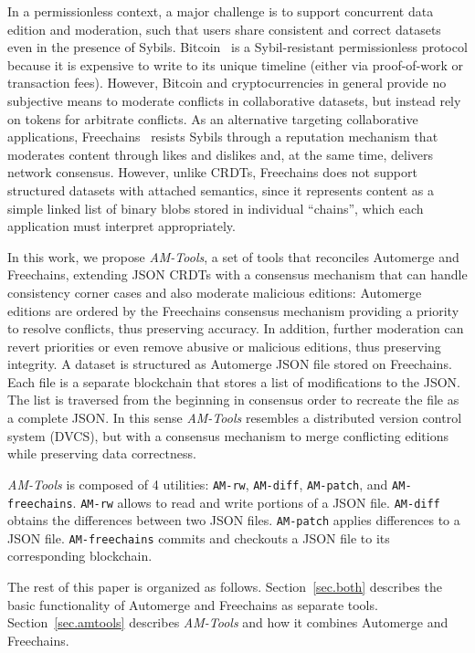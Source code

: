 \documentclass[12pt]{article}
\newcommand{\code}[1]  {\texttt{\footnotesize{#1}}}
\begin{document}
In a permissionless context, a major challenge is to support concurrent data
edition and moderation, such that users share consistent and correct datasets
even in the presence of Sybils.
%
Bitcoin~\cite{nakamoto2008bitcoin} is a Sybil-resistant permissionless protocol
because it is expensive to write to its unique timeline (either via
proof-of-work or transaction fees).
However, Bitcoin and cryptocurrencies in general provide no subjective means to
moderate conflicts in collaborative datasets, but instead rely on tokens for
arbitrate conflicts.
%
As an alternative targeting collaborative applications,
Freechains~\cite{sant2020freechains} resists Sybils through a reputation
mechanism that moderates content through likes and dislikes and, at the same
time, delivers network consensus.
However, unlike CRDTs, Freechains does not support structured datasets with
attached semantics, since it represents content as a simple linked list of
binary blobs stored in individual ``chains'', which each application must
interpret appropriately.

In this work, we propose \emph{AM-Tools}, a set of tools that reconciles
Automerge and Freechains, extending JSON CRDTs with a consensus mechanism that
can handle consistency corner cases and also moderate malicious editions:
Automerge editions are ordered by the Freechains consensus mechanism providing
a priority to resolve conflicts, thus preserving accuracy.
In addition, further moderation can revert priorities or even remove abusive or
malicious editions, thus preserving integrity.
%
A dataset is structured as Automerge JSON file stored on Freechains.
Each file is a separate blockchain that stores a list of modifications to the
JSON.
The list is traversed from the beginning in consensus order to recreate the
file as a complete JSON.
%
In this sense \emph{AM-Tools} resembles a distributed version control system
(DVCS), but with a consensus mechanism to merge conflicting editions while
preserving data correctness.

\emph{AM-Tools} is composed of 4 utilities: \code{AM-rw}, \code{AM-diff},
\code{AM-patch}, and \code{AM-freechains}.
%
\code{AM-rw} allows to read and write portions of a JSON file.
\code{AM-diff} obtains the differences between two JSON files.
\code{AM-patch} applies differences to a JSON file.
\code{AM-freechains} commits and checkouts a JSON file to its corresponding
blockchain.

The rest of this paper is organized as follows.
Section~\ref{sec.both} describes the basic functionality of Automerge and
Freechains as separate tools.
Section~\ref{sec.amtools} describes \emph{AM-Tools} and how it combines
Automerge and Freechains.
\end{document}
